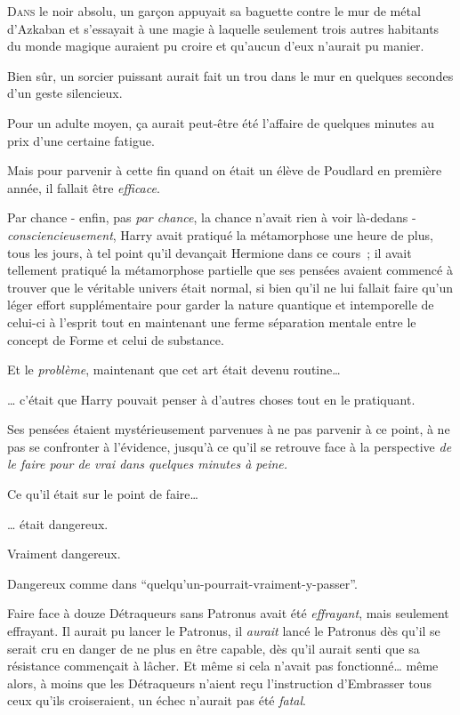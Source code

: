 

\lettrine{D}{ans}  le noir absolu, un garçon appuyait sa baguette contre le mur de métal d'Azkaban et s'essayait à une magie à laquelle seulement trois autres habitants du monde magique auraient pu croire et qu'aucun d'eux n'aurait pu manier.

Bien sûr, un sorcier puissant aurait fait un trou dans le mur en quelques secondes d'un geste silencieux.

Pour un adulte moyen, ça aurait peut-être été l'affaire de quelques minutes au prix d'une certaine fatigue.

Mais pour parvenir à cette fin quand on était un élève de Poudlard en première année, il fallait être \emph{efficace}.

Par chance - enfin, pas \emph{par chance}, la chance n'avait rien à voir là-dedans - \emdashhyp\emph{consciencieusement}, Harry avait pratiqué la métamorphose une heure de plus, tous les jours, à tel point qu'il devançait Hermione dans ce cours~; il avait tellement pratiqué la métamorphose partielle que ses pensées avaient commencé à trouver que le véritable univers était normal, si bien qu'il ne lui fallait faire qu'un léger effort supplémentaire pour garder la nature quantique et intemporelle de celui-ci à l'esprit tout en maintenant une ferme séparation mentale entre le concept de Forme et celui de substance.

Et le \emph{problème}, maintenant que cet art était devenu routine…

… c'était que Harry pouvait penser à d'autres choses tout en le pratiquant.

Ses pensées étaient mystérieusement parvenues à ne pas parvenir à ce point, à ne pas se confronter à l'évidence, jusqu'à ce qu'il se retrouve face à la perspective \emph{de le faire pour de vrai dans quelques minutes à peine.}

Ce qu'il était sur le point de faire…

… était dangereux.

Vraiment dangereux.

Dangereux comme dans “quelqu'un-pourrait-vraiment-y-passer”.

Faire face à douze Détraqueurs sans Patronus avait été \emph{effrayant}, mais seulement effrayant. Il aurait pu lancer le Patronus, il \emph{aurait} lancé le Patronus dès qu'il se serait cru en danger de ne plus en être capable, dès qu'il aurait senti que sa résistance commençait à lâcher. Et même si cela n'avait pas fonctionné… même alors, à moins que les Détraqueurs n'aient reçu l'instruction d'Embrasser tous ceux qu'ils croiseraient, un échec n'aurait pas été \emph{fatal}.

